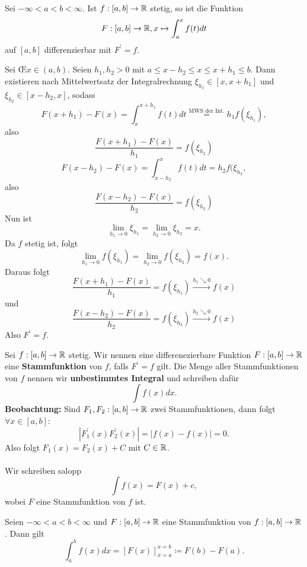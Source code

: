 \begin{subtheorem}
	Sei $ - \infty < a < b < \infty $. Ist $ f: [a, b] \to \mathbb{R}  $ stetig, so ist die Funktion
	\[
		F:[a, b] \to \mathbb{R}, x \mapsto \int_{a}^{x} f(t) dt
	\]
	auf $ [a, b] $ differenzierbar mit $ F^{\prime} = f $.
\end{subtheorem}

\begin{subproof*}
	Sei \OE $ x \in (a, b) $.
	Seien $ h_1, h_2 > 0 $ mit $ a \leq x - h_2 \leq x \leq x + h_1 \leq b $. Dann existieren nach Mittelwertsatz der Integralrechnung $ \xi_{h_1} \in [x, x + h_1] $ und $ \xi_{h_2} \in [x - h_2, x] $, sodass
	\[
		F(x + h_1) - F(x) = \int_{x}^{x + h_1} f(t) dt \overset{\text{MWS der Int.} }{=} h_1 f(\xi_{h_1} ), 
	\]
	also
	\[
		\frac{ F(x + h_1) - F(x) }{ h_1 } = f(\xi_{h_2})
	\]
	\[
		F(x - h_2) - F(x) = \int_{x - h_2}^{x} f(t) dt = h_2 f(\xi_{h_2} , 
	\]
	also
	\[
		\frac{ F(x - h_2) - F(x) }{ h_2 } = f(\xi_{h_2} )
	\]
	Nun ist
	\[
		\lim_{h_1 \to 0} \xi_{h_1} = \lim_{h_2 \to 0} \xi_{h_2} = x.
	\]
	Da $ f $ stetig ist, folgt
	\[
		\lim_{h_1 \to 0} f(\xi_{h_1} ) = \lim_{h_2 \to 0} f(\xi_{h_2} ) = f(x).
	\]
	Daraus folgt
	\[
		\frac{ F(x + h_1) - F(x) }{ h_1 } = f(\xi_{h_1} ) \overset{h_1 \searrow 0}{\to }f(x)
	\]
	und
	\[
		\frac{ F(x - h_2) - F(x) }{ h_2 } = f(\xi_{h_2} ) \overset{h_2 \searrow 0}{\to }f(x)
	\]
	Also $ F^{\prime} = f $.
\end{subproof*}

\begin{subdefinition}[Stammfunktion]
	Sei $ f:[a, b] \to \mathbb{R}  $ stetig. Wir nennen eine differenezierbare Funktion $ F: [a, b] \to \mathbb{R}  $ eine \textbf{Stammfunktion} von $ f $, falls $ F^{\prime} = f $ gilt. Die Menge aller Stammfunktionen von $ f $ nennen wir \textbf{unbestimmtes Integral} und schreiben dafür
	\[
		\int f(x) dx.
	\]
	\textbf{Beobachtung:} Sind $ F_1, F_2: [a, b] \to \mathbb{R}  $ zwei Stammfunktionen, dann folgt $ \forall x \in [a, b] $:
	\[
		\left| F_1^{\prime} (x) F_2^{\prime} (x) \right| = \left| f(x) - f(x) \right| = 0.
	\]
	Also folgt $ F_1(x) = F_2(x) + C $ mit $ C \in \mathbb{R}  $.\\
	\\
	Wir schreiben salopp
	\[
		\int f(x) = F(x) + c,
	\]
	wobei $ F $ eine Stammfunktion von $ f $ ist.
\end{subdefinition}

\begin{subcorollary}
	Seien $ -\infty < a < b < \infty $ und $ F: [a, b] \to \mathbb{R}  $ eine Stammfunktion von $ f : [a, b] \to  \mathbb{R}  $. Dann gilt
	\[
		\int_{a}^{b}f(x) dx = \left[ F(x) \right]_{x = a}^{x = b} \coloneqq F(b) - F(a).
	\]
\end{subcorollary}

